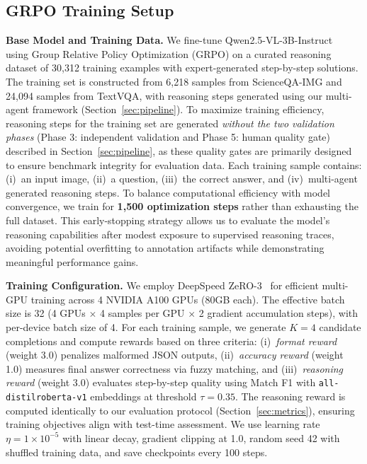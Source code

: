 
\subsection{GRPO Training Setup}
\label{sec:grpo_setup}

\textbf{Base Model and Training Data.}
We fine-tune Qwen2.5-VL-3B-Instruct~\cite{qwen2vl2024} using Group Relative Policy Optimization (GRPO) on a curated reasoning dataset of 30,312 training examples with expert-generated step-by-step solutions. The training set is constructed from 6,218 samples from ScienceQA-IMG and 24,094 samples from TextVQA, with reasoning steps generated using our multi-agent framework (Section~\ref{sec:pipeline}). To maximize training efficiency, reasoning steps for the training set are generated \emph{without the two validation phases} (Phase 3: independent validation and Phase 5: human quality gate) described in Section~\ref{sec:pipeline}, as these quality gates are primarily designed to ensure benchmark integrity for evaluation data. Each training sample contains: (i)~an input image, (ii)~a question, (iii)~the correct answer, and (iv)~multi-agent generated reasoning steps. To balance computational efficiency with model convergence, we train for \textbf{1,500 optimization steps} rather than exhausting the full dataset. This early-stopping strategy allows us to evaluate the model's reasoning capabilities after modest exposure to supervised reasoning traces, avoiding potential overfitting to annotation artifacts while demonstrating meaningful performance gains.

\textbf{Training Configuration.}
We employ DeepSpeed ZeRO-3~\cite{rajbhandari2020zero} for efficient multi-GPU training across 4 NVIDIA A100 GPUs (80GB each). The effective batch size is 32 (4 GPUs $\times$ 4 samples per GPU $\times$ 2 gradient accumulation steps), with per-device batch size of 4. For each training sample, we generate $K=4$ candidate completions and compute rewards based on three criteria: (i)~\textit{format reward} (weight 3.0) penalizes malformed JSON outputs, (ii)~\textit{accuracy reward} (weight 1.0) measures final answer correctness via fuzzy matching, and (iii)~\textit{reasoning reward} (weight 3.0) evaluates step-by-step quality using Match F1 with \texttt{all-distilroberta-v1} embeddings at threshold $\tau=0.35$. The reasoning reward is computed identically to our evaluation protocol (Section~\ref{sec:metrics}), ensuring training objectives align with test-time assessment. We use learning rate $\eta = 1 \times 10^{-5}$ with linear decay, gradient clipping at 1.0, random seed 42 with shuffled training data, and save checkpoints every 100 steps.


